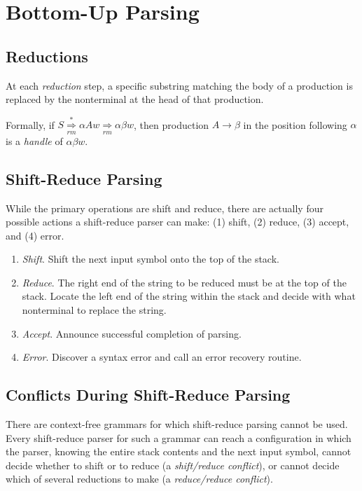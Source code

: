 \documentclass[12pt,a4paper,twoside,openany]{book}
\begin{document}
\section{Bottom-Up Parsing}
\subsection{Reductions}

At each \textit{reduction} step, a specific substring matching the body of a production is replaced by the nonterminal at the head of that production.

Formally, if $S\underset{rm}{\overset{*}{\Rightarrow}}\alpha Aw\underset{rm}{\Rightarrow}\alpha\beta w$, then production $A\rightarrow\beta$ in the position following $\alpha$ is a \textit{handle} of $\alpha\beta w$.

\subsection{Shift-Reduce Parsing}

While the primary operations are shift and reduce, there are actually four possible actions a shift-reduce parser can make: (1) shift, (2) reduce, (3) accept, and (4) error.
\begin{enumerate}
    \item \textit{Shift}. Shift the next input symbol onto the top of the stack.
    \item \textit{Reduce}. The right end of the string to be reduced must be at the top of the stack. Locate the left end of the string within the stack and decide with what nonterminal to replace the string.
    \item \textit{Accept}. Announce successful completion of parsing.
    \item \textit{Error}. Discover a syntax error and call an error recovery routine.
\end{enumerate}

\subsection{Conflicts During Shift-Reduce Parsing}

There are context-free grammars for which shift-reduce parsing cannot be used. Every shift-reduce parser for such a grammar can reach a configuration in which the parser, knowing the entire stack contents and the next input symbol, cannot decide whether to shift or to reduce (a \textit{shift/reduce conflict}), or cannot decide which of several reductions to make (a \textit{reduce/reduce conflict}).
\end{document}
